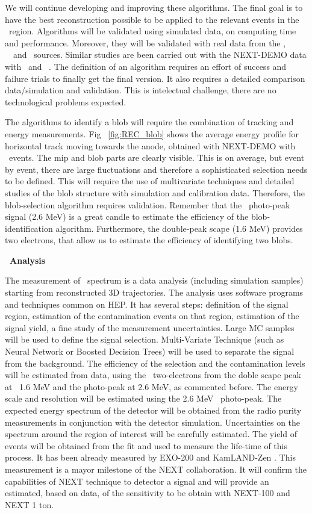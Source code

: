 We will continue developing and improving these algorithms.
The final goal is to have the best reconstruction possible to be applied to the relevant events in the \Qbb ~region. 
Algorithms will be validated using simulated data, on computing time  and performance. 
Moreover, they will be validated with real data from the \NA,  ~\CS ~and \Tl ~sources. Similar studies are been carried out with the NEXT-DEMO data with \NA ~and ~\CS.
The definition of an algorithm requires an effort of success and failure trials to finally get the final version. It also requires a detailed comparison data/simulation and validation. This is intelectual challenge, there are no technological problems expected.

The algorithms to identify a blob will require the combination of tracking and energy measurements. Fig ~\ref{fig:REC_blob} shows the average energy profile for horizontal track moving towards the anode, obtained with NEXT-DEMO with \NA ~events. The mip and blob parts are clearly visible. This is on average, but event by event, there are large fluctuations and therefore a sophisticated selection needs to be defined. This will require the use of multivariate techniques and detailed studies of the blob structure with simulation and calibration data.
Therefore, the blob-selection algorithm requires validation.
Remember that the \Tl ~photo-peak signal (2.6 MeV) is a great candle to estimate the efficiency of the blob-identification algorithm. Furthermore, the double-peak scape (1.6 MeV) provides two electrons, that allow us to estimate the efficiency of identifying two blobs. 

{\bf \bb ~Analysis}

The measurement of \bb ~spectrum is a data analysis (including simulation samples) starting from reconstructed 3D trajectories.
The analysis uses software programs and techniques common on HEP.
It has several steps: definition of the signal region, estimation of the contamination events on that region, estimation of the signal yield, a fine study of the measurement uncertainties.
Large MC samples will be used to define the signal selection. Multi-Variate Technique (such as Neural Network or Boosted Decision Trees) will be used to separate the signal from the background.
The efficiency of the selection and the contamination levels will be estimated from data, using the \Tl ~two-electrons from the doble scape peak at ~1.6 MeV and the photo-peak at 2.6 MeV, as commented before. The energy scale and resolution will be estimated using the 2.6 MeV \Tl ~photo-peak. The expected energy spectrum of the detector will be obtained from the radio purity measurements in conjunction with the detector simulation. Uncertainties on the spectrum around the region of interest will be carefully estimated.
The yield of \bb~ events will be obtained from the fit and used to measure the life-time of this process. 
It has been already measured by EXO-200 \cite{EXO} and KamLAND-Zen \cite{KAMLAND}.
This measurement is a mayor milestone of the NEXT collaboration. 
It will confirm the capabilities of NEXT technique to detector a \bbonu signal and will provide an estimated, based on data, of the sensitivity to be obtain with NEXT-100 and NEXT 1 ton. 

